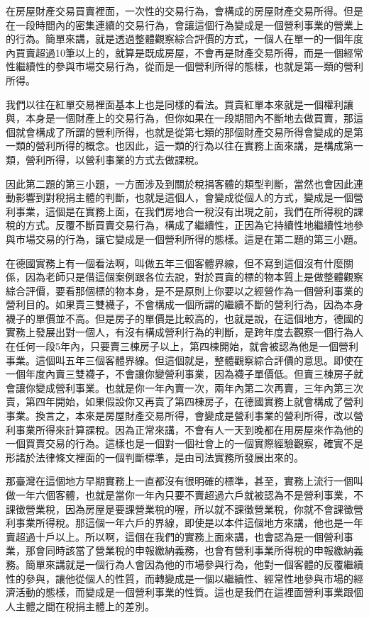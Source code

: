 \documentclass[]{ctexbook}
\begin{document}
在房屋財產交易買賣裡面，一次性的交易行為，會構成的房屋財產交易所得。但是在一段時間內的密集連續的交易行為，會讓這個行為變成是一個營利事業的營業上的行為。簡單來講，就是透過整體觀察綜合評價的方式，一個人在單一的一個年度內買賣超過10筆以上的，就算是既成房屋，不會再是財產交易所得，而是一個經常性繼續性的參與市場交易行為，從而是一個營利所得的態樣，也就是第一類的營利所得。

我們以往在紅單交易裡面基本上也是同樣的看法。買賣紅單本來就是一個權利讓與，本身是一個財產上的交易行為，但你如果在一段期間內不斷地去做買賣，那這個就會構成了所謂的營利所得，也就是從第七類的那個財產交易所得會變成的是第一類的營利所得的概念。也因此，這一類的行為以往在實務上面來講，是構成第一類，營利所得，以營利事業的方式去做課稅。

因此第二題的第三小題，一方面涉及到關於稅捐客體的類型判斷，當然也會因此連動影響到對稅捐主體的判斷，也就是這個人，會變成從個人的方式，變成是一個營利事業，這個是在實務上面，在我們房地合一稅沒有出現之前，我們在所得稅的課稅的方式。反覆不斷買賣交易行為，構成了繼續性，正因為它持續性地繼續性地參與市場交易的行為，讓它變成是一個營利所得的態樣。這是在第二題的第三小題。

在德國實務上有一個看法啊，叫做五年三個客體界線，但不寫到這個沒有什麼關係，因為老師只是借這個案例跟各位去說，對於買賣的標的物本質上是做整體觀察綜合評價，要看那個標的物本身，是不是原則上你要以之經營作為一個營利事業的營利目的。如果賣三雙襪子，不會構成一個所謂的繼續不斷的營利行為，因為本身襪子的單價並不高。但是房子的單價是比較高的，也就是說，在這個地方，德國的實務上發展出對一個人，有沒有構成營利行為的判斷，是跨年度去觀察一個行為人在任何一段5年內，只要賣三棟房子以上，第四棟開始，就會被認為他是一個營利事業。這個叫五年三個客體界線。但這個就是，整體觀察綜合評價的意思。即使在一個年度內賣三雙襪子，不會讓你變營利事業，因為襪子單價低。但賣三棟房子就會讓你變成營利事業。也就是你一年內賣一次，兩年內第二次再賣，三年內第三次賣，第四年開始，如果假設你又再賣了第四棟房子，在德國實務上就會構成了營利事業。換言之，本來是房屋財產交易所得，會變成是營利事業的營利所得，改以營利事業所得來計算課稅。因為正常來講，不會有人一天到晚都在用房屋來作為他的一個買賣交易的行為。這樣也是一個對一個社會上的一個實際經驗觀察，確實不是形諸於法律條文裡面的一個判斷標準，是由司法實務所發展出來的。

那臺灣在這個地方早期實務上一直都沒有很明確的標準，甚至，實務上流行一個叫做一年六個客體，也就是當你一年內只要不賣超過六戶就被認為不是營利事業，不課徵營業稅，因為房屋是要課營業稅的喔，所以就不課徵營業稅，你就不會課徵營利事業所得稅。那這個一年六戶的界線，即使是以本件這個地方來講，他也是一年賣超過十戶以上。所以啊，這個在我們的實務上面來講，也會認為是一個營利事業，那會同時該當了營業稅的申報繳納義務，也會有營利事業所得稅的申報繳納義務。簡單來講就是一個行為人會因為他的市場參與行為，他對一個客體的反覆繼續性的參與，讓他從個人的性質，而轉變成是一個以繼續性、經常性地參與市場的經濟活動的態樣，而變成是一個營利事業的性質。這也是我們在這裡面營利事業跟個人主體之間在稅捐主體上的差別。
\end{document}
